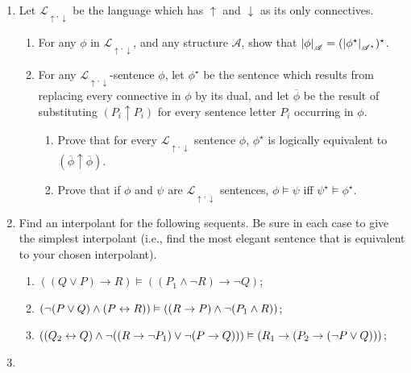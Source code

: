 {\begin{enumerate}
	\item Let $\mathcal{L}_{\uparrow,\downarrow}$ be the language which has $\uparrow$ and $\downarrow$ as its only connectives. \begin{enumerate}
		\item  For any $\phi$ in $\mathcal{L}_{\uparrow,\downarrow}$, and any structure $\mathscr{A}$, show that $\left|\phi\right|_{\mathscr{A}} = (\left|\phi^{\star}\right|_{\mathscr{A^{\star}}})^{\star}$.	
	 \item For any $\mathcal{L}_{\uparrow,\downarrow}$-sentence $\phi$, let $\phi^{\star}$ be the sentence which results from replacing every connective in $\phi$ by its dual, and let $\overline{\phi}$ be the result of substituting $(P_{i}\uparrow P_{i})$ for every sentence letter $P_{i}$ occurring in $\phi$.	
	\begin{enumerate}
		\item Prove that for every $\mathcal{L}_{\uparrow,\downarrow}$ sentence $\phi$, $\phi^{\star}$ is logically equivalent to $(\overline{\phi}\uparrow\overline{\phi})$.
		\item Prove that if $\phi$ and $\psi$ are $\mathcal{L}_{\uparrow,\downarrow}$ sentences, $\phi \vDash \psi$ iff $\psi^{\star} \vDash \phi^{\star}$.
	\end{enumerate}\end{enumerate}


	\item Find an interpolant for the following sequents. Be sure in each case to give the simplest interpolant (i.e., find  the most elegant sentence that is equivalent to your chosen interpolant).\begin{enumerate}
		\item $((Q\vee P)\to R)\vDash ((P_{1}\wedge \neg R)\to\neg Q)$;
			\item $(\neg(P \vee Q)
		\wedge (P \leftrightarrow R)) \vDash ((R \to P) \wedge \neg (P_{1} \wedge R))$;
		 \item $((Q_{2} \leftrightarrow Q) \wedge
		    \neg ((R \to \neg P_{1}) \vee \neg (P \to Q))) \vDash
		    (R_{1} \to (P_{2} \to (\neg
		    P \vee Q)))$;
	\end{enumerate}
	




\item \begin{enumerate}


\end{enumerate}
\end{enumerate}}
